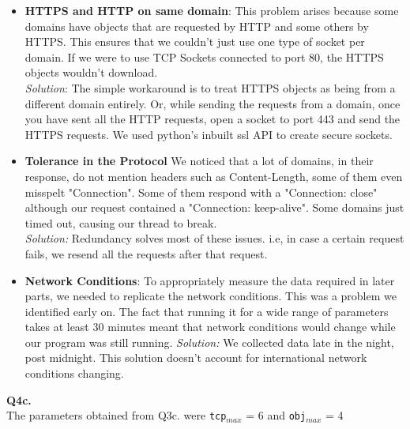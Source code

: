 \documentclass[12pt]{article}
\begin{document}
\begin{itemize}
\item \textbf{HTTPS and HTTP on same domain}: This problem arises because some domains have objects that are requested by HTTP and some others by HTTPS. This ensures that we couldn't just use one type of socket per domain. If we were to use TCP Sockets connected to port 80, the HTTPS objects wouldn't download.\\
\textit{Solution}: The simple workaround is to treat HTTPS objects as being from a different domain entirely. Or, while sending the requests from a domain, once you have sent all the HTTP requests, open a socket to port 443 and send the HTTPS requests. We used python's inbuilt ssl API to create secure sockets.
\item \textbf{Tolerance in the Protocol} We noticed that a lot of domains, in their response, do not mention headers such as Content-Length, some of them even misspelt "Connection". Some of them respond with a "Connection: close" although our request contained a "Connection: keep-alive". Some domains just timed out, causing our thread to break.
\\\textit{Solution:} Redundancy solves most of these issues. i.e, in case a certain request fails, we resend all the requests after that request.
\item \textbf{Network Conditions}: To appropriately measure the data required in later parts, we needed to replicate the network conditions. This was a problem we identified early on. The fact that running it for a wide range of parameters takes at least 30 minutes meant that network conditions would change while our program was still running. 
\textit{Solution:} We collected data late in the night, post midnight. This solution doesn't account for international network conditions changing.
\end{itemize}
{\bfseries Q4c.}
\\The parameters obtained from Q3c. were \texttt{tcp$_{max}$} = 6 and \texttt{obj$_{max}$} = 4
\end{document}
